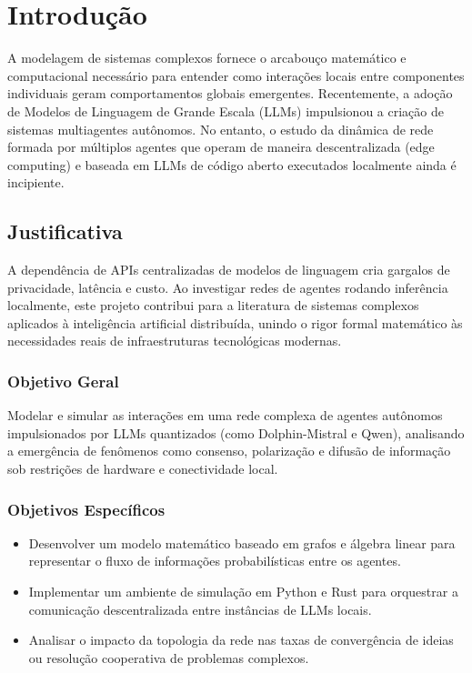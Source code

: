 \chapter{Introdução}
A modelagem de sistemas complexos fornece o arcabouço matemático e computacional necessário para entender como interações locais entre componentes individuais geram comportamentos globais emergentes. Recentemente, a adoção de Modelos de Linguagem de Grande Escala (LLMs) impulsionou a criação de sistemas multiagentes autônomos. No entanto, o estudo da dinâmica de rede formada por múltiplos agentes que operam de maneira descentralizada (edge computing) e baseada em LLMs de código aberto executados localmente ainda é incipiente.

\section{Justificativa}
A dependência de APIs centralizadas de modelos de linguagem cria gargalos de privacidade, latência e custo. Ao investigar redes de agentes rodando inferência localmente, este projeto contribui para a literatura de sistemas complexos aplicados à inteligência artificial distribuída, unindo o rigor formal matemático às necessidades reais de infraestruturas tecnológicas modernas.

\subsection{Objetivo Geral}
Modelar e simular as interações em uma rede complexa de agentes autônomos impulsionados por LLMs quantizados (como Dolphin-Mistral e Qwen), analisando a emergência de fenômenos como consenso, polarização e difusão de informação sob restrições de hardware e conectividade local.

\subsection{Objetivos Específicos}
\begin{itemize}
    \item Desenvolver um modelo matemático baseado em grafos e álgebra linear para representar o fluxo de informações probabilísticas entre os agentes.
    \item Implementar um ambiente de simulação em Python e Rust para orquestrar a comunicação descentralizada entre instâncias de LLMs locais.
    \item Analisar o impacto da topologia da rede nas taxas de convergência de ideias ou resolução cooperativa de problemas complexos.
\end{itemize}
